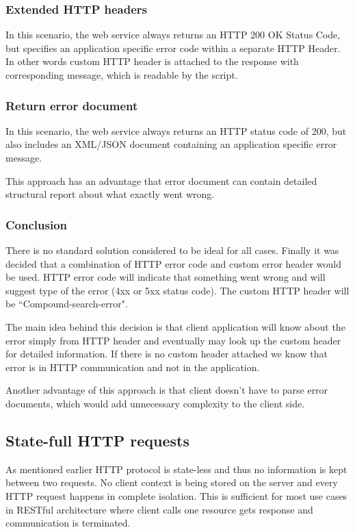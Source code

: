 \documentclass[thesis=M,english]{FITthesis}[2012/10/20]
\begin{document}
\subsubsection{Extended HTTP headers}
In this scenario, the web service always returns an HTTP 200 OK Status Code, but specifies an application specific error code within a separate HTTP Header. In other words custom HTTP header is attached to the response with corresponding message, which is readable by the script.

\subsubsection{Return error document}
In this scenario, the web service always returns an HTTP status code of 200, but also includes an XML/JSON document containing an application specific error message.

This approach has an advantage that error document can contain detailed structural report about what exactly went wrong.

\subsubsection{Conclusion}
There is no standard solution considered to be ideal for all cases. Finally it was decided that a combination of HTTP error code and custom error header would be used. HTTP error code will indicate that something went wrong and will suggest type of the error (4xx or 5xx status code). The custom HTTP header will be ``Compound-search-error".

The main idea behind this decision is that client application will know about the error simply from HTTP header and eventually may look up the custom header for detailed information. If there is no custom header attached we know that error is in HTTP communication and not in the application.

Another advantage of this approach is that client doesn’t have to parse error documents, which would add unnecessary complexity to the client side.

\subsection{State-full HTTP requests}
As mentioned earlier HTTP protocol is state-less and thus no information is kept between two requests. No client context is being stored on the server and every HTTP request happens in complete isolation. This is sufficient for most use cases in RESTful architecture where client calls one resource gets response and communication is terminated. 
\end{document}
